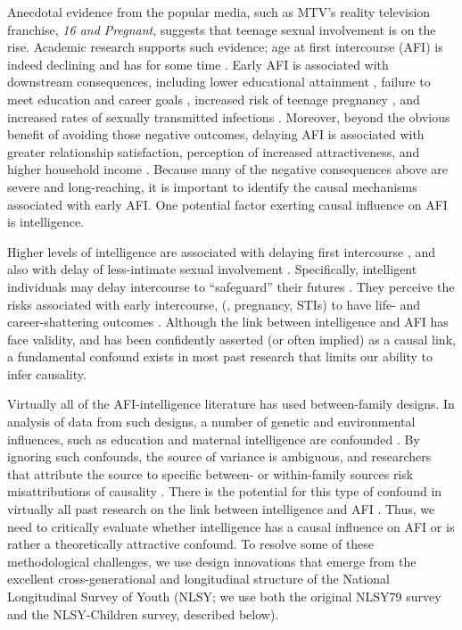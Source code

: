 Anecdotal evidence from the popular media, such as MTV's reality television franchise, \textit{16 and Pregnant}\nocite{mtv}, suggests that teenage sexual involvement is on the rise. Academic research supports such evidence; age at first intercourse (AFI) is indeed declining and has for some time \citep{bozon2003,finer2007trends,Kann2014}. Early AFI is associated with downstream consequences, including lower educational attainment \citep{Harden2012,Spriggs2008,Wellings2001}, failure to meet education and career goals \citep{halpern2000smart}, increased risk of teenage pregnancy \citep{Leitenberg2000,Wellings2001}, and increased rates of sexually transmitted infections \citep[STIs;][]{kaestle2005young}. Moreover, beyond the obvious benefit of avoiding those negative outcomes, delaying AFI is associated with greater relationship satisfaction, perception of increased attractiveness, and higher household income \citep{Harden2012}. Because many of the negative consequences above are severe and long-reaching, it is important to identify the causal mechanisms associated with early AFI. One potential factor exerting causal influence on AFI is intelligence.

Higher levels of intelligence are associated with delaying first intercourse \citep{halpern2000smart,mott1983early,Paul2000,Woodward2001}, and also with delay of less-intimate sexual involvement \citep{halpern2000smart}. Specifically, intelligent individuals may delay intercourse to ``safeguard'' their futures \citep{kirby2002effective, manlove1998influence, raffaelli2003sexual}. They perceive the risks associated with early intercourse, (\eg, pregnancy, STIs) to have life- and career-shattering outcomes \citep{halpern2000smart,harden2011don}. Although the link between intelligence and AFI has face validity, and has been confidently asserted (or often implied) as a causal link, a fundamental confound exists in most past research that limits our ability to infer causality.

Virtually all of the AFI-intelligence literature has used between-family designs. In analysis of data from such designs, a number of genetic and environmental influences, such as education and maternal intelligence are confounded \citep{DOnofrio2013,harden2014genetic,Lahey2010,Rodgers2000}. By ignoring such confounds, the source of variance is ambiguous, and researchers that attribute the source to specific between- or within-family sources risk misattributions of causality \citep{Rowe1997,Rutter2007}. There is the potential for this type of confound in virtually all past research on the link between intelligence and AFI \citep{harden2011don,harden2014genetic,plomin2004intelligence,rodgers1999nature,rodgers1994df}. Thus, we need to critically evaluate whether intelligence has a causal influence on AFI or is rather a theoretically attractive confound. To resolve some of these methodological challenges, we use design innovations that emerge from the excellent cross-generational and longitudinal structure of the National Longitudinal Survey of Youth (NLSY; we use both the original NLSY79 survey and the NLSY-Children survey, described below).
%
